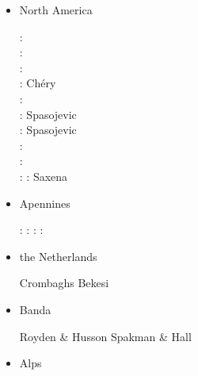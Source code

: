 \begin{itemize}
\item North America 

\begin{scriptsize}
\nineteenseventythree: \cite{sabu73}\\
\nineteenninety: \cite{huha90}\\
\nineteenninetyseven: \cite{bugm97}\\
\twothousandone: Ch\'ery \etal \cite{chzh01} \\
\twothousandsix: \cite{besb06}\\
\twothousandeight: Spasojevic \etal \cite{splg08}\\
\twothousandnine: Spasojevic \etal \cite{splg09}\\
\twothousandtwelve: \cite{beck12}\\
\twothousandthirteen: \cite{ghbh13}\cite{simi13}\\
\twothousandfifteen: \cite{riag15}
\twothousandtwentyone: Saxena \etal \cite{sacp21}
\end{scriptsize}

\item Apennines 

\begin{scriptsize}
\nineteenninetyeight: \cite{buwg98}
\twothousandseven: \cite{shpy07}
\twothousandnine: \cite{rohu09}
\twothousandfifteen: \cite{vami15}
\end{scriptsize}

\item the Netherlands 

\begin{scriptsize}
\twothousandtwo Crombaghs \etal \cite{crdv02}
\twothousandtwenty Bekesi \etal \cite{besb20}
\end{scriptsize}



\item Banda 

\begin{scriptsize}
Royden \& Husson \cite{rohu09}
Spakman \& Hall \cite{spha10}
\end{scriptsize}


\item Alps 


\end{itemize}
